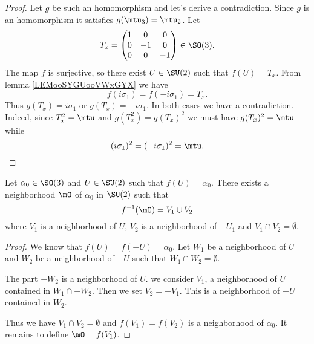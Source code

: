 \begin{proof}
    Let \( g\) be such an homomorphism and let's derive a contradiction. Since \( g\) is an homomorphism it satisfies \( g(\mtu_3)=\mtu_2\). Let 
    \begin{equation}
        T_x=\begin{pmatrix}
            1    &   0    &   0    \\
            0    &   -1    &   0    \\
            0    &   0    &   -1
        \end{pmatrix}\in \SO(3).
    \end{equation}
    The map \( f\) is surjective, so there exist \( U\in \SU(2)\) such that \( f(U)=T_x\). From lemma \ref{LEMooSYGUooVWxGYX} we have
    \begin{equation}
        f(i\sigma_1)=f(-i\sigma_1)=T_x.
    \end{equation}
    Thus \( g(T_x)=i\sigma_1\) or \( g(T_x)=-i\sigma_1\). In both cases we have a contradiction. Indeed, since \( T_x^2=\mtu\) and \( g(T_x^2)=g(T_x)^2\) we must have \( g(T_x)^2=\mtu\) while
    \begin{equation}
        (i\sigma_1)^2=(-i\sigma_1)^2=\mtu.
    \end{equation}
\end{proof}

\begin{lemma}       \label{LEMooRCSSooTvAaJY}
    Let \( \alpha_0\in \SO(3)\) and \( U\in \SU(2)\) such that \( f(U)=\alpha_0\). There exists a neighborhood \(\mO\) of \( \alpha_0\) in \( \SU(2)\) such that
    \begin{equation}
        f^{-1}(\mO)=V_1\cup V_2
    \end{equation}
    where \( V_1\) is a neighborhood of \( U\), \( V_2\) is a neighborhood of \( -U_1\) and \( V_1\cap V_2=\emptyset\).
\end{lemma}

\begin{proof}
    We know that \( f(U)=f(-U)=\alpha_0\). Let \( W_1\) be a neighborhood of \( U\) and \( W_2\) be a neighborhood of \( -U\) such that \( W_1\cap W_2=\emptyset\).

    The part \( -W_2\) is a neighborhood of \( U\). we consider \( V_1\), a neighborhood of \( U\) contained in \( W_1\cap -W_2\). Then we set \( V_2=-V_1\). This is a neighborhood of \(-U\) contained in \( W_2\).

    Thus we have \( V_1\cap V_2=\emptyset\) and \( f(V_1)=f(V_2)\) is a neighborhood of \( \alpha_0\). It remains to define \( \mO=f(V_1)\).
\end{proof}

